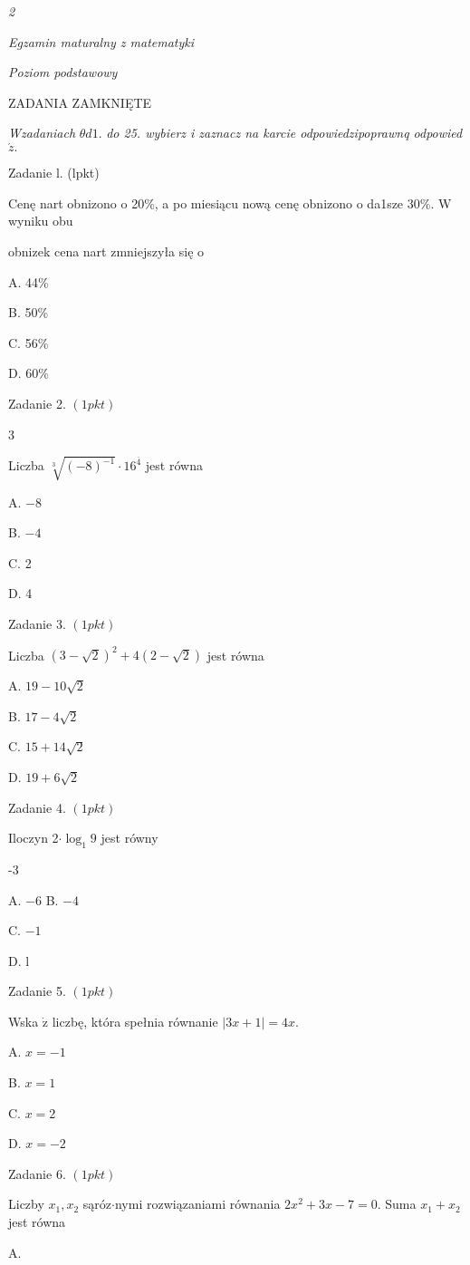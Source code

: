 \documentclass[a4paper,12pt]{article}
\begin{document}
{\it 2}

{\it Egzamin maturalny z matematyki}

{\it Poziom podstawowy}

ZADANIA ZAMKNIĘTE

{\it Wzadaniach} $\theta d1.$ {\it do 25. wybierz i zaznacz na karcie odpowiedzipoprawnq odpowied} $\acute{z}.$

Zadanie l. (lpkt)

Cenę nart obnizono o 20\%, a po miesiącu nową cenę obnizono o da1sze 30\%. W wyniku obu

obnizek cena nart zmniejszyła się o

A. 44\%

B. 50\%

C. 56\%

D. 60\%

Zadanie 2. $(1pkt)$

3

Liczba $\sqrt[3]{(-8)^{-1}}\cdot 16^{\overline{4}}$ jest równa

A. $-8$

B. $-4$

C. 2

D. 4

Zadanie 3. $(1pkt)$

Liczba $(3-\sqrt{2})^{2}+4(2-\sqrt{2})$ jest równa

A. $19-10\sqrt{2}$

B. $17-4\sqrt{2}$

C. $15+14\sqrt{2}$

D. $19+6\sqrt{2}$

Zadanie 4. $(1pkt)$

Iloczyn 2$\cdot\log_{1}9$ jest równy

-3

A. $-6$ B. $-4$

C. $-1$

D. l

Zadanie 5. $(1pkt)$

Wska $\dot{\mathrm{z}}$ liczbę, która spełnia równanie $|3x+1|=4x.$

A. $x=-1$

B. $x=1$

C. $x=2$

D. $x=-2$

Zadanie 6. $(1pkt)$

Liczby $x_{1}, x_{2}$ sąróz$\cdot$nymi rozwiązaniami równania $2x^{2}+3x-7=0$. Suma $x_{1}+x_{2}$ jest równa

A.
\end{document}
